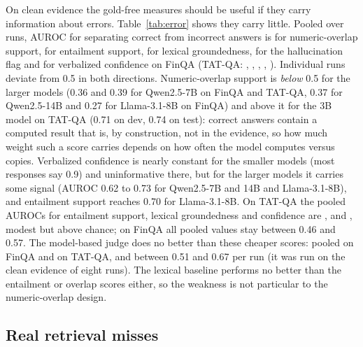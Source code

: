 On clean evidence the gold-free measures should be useful if they carry information about errors.
Table~\ref{tab:error} shows they carry little.
Pooled over runs, AUROC for separating correct from incorrect answers is \errFinoverlap{} for numeric-overlap support, \errFinnli{} for entailment support, \errFinlexical{} for lexical groundedness, \errFinnohalluc{} for the hallucination flag and \errFinconf{} for verbalized confidence on FinQA (TAT-QA: \errTatoverlap, \errTatnli, \errTatlexical, \errTatnohalluc, \errTatconf).
Individual runs deviate from 0.5 in both directions.
Numeric-overlap support is \emph{below} 0.5 for the larger models (0.36 and 0.39 for Qwen2.5-7B on FinQA and TAT-QA, 0.37 for Qwen2.5-14B and 0.27 for Llama-3.1-8B on FinQA) and above it for the 3B model on TAT-QA (0.71 on dev, 0.74 on test): correct answers contain a computed result that is, by construction, not in the evidence, so how much weight such a score carries depends on how often the model computes versus copies.
Verbalized confidence is nearly constant for the smaller models (most responses say 0.9) and uninformative there, but for the larger models it carries some signal (AUROC 0.62 to 0.73 for Qwen2.5-7B and 14B and Llama-3.1-8B), and entailment support reaches 0.70 for Llama-3.1-8B.
On TAT-QA the pooled AUROCs for entailment support, lexical groundedness and confidence are \errTatnli, \errTatlexical{} and \errTatconf, modest but above chance; on FinQA all pooled values stay between 0.46 and 0.57.
The model-based judge does no better than these cheaper scores: pooled \errFinjudge{} on FinQA and \errTatjudge{} on TAT-QA, and between 0.51 and 0.67 per run (it was run on the clean evidence of eight runs). The lexical baseline performs no better than the entailment or overlap scores either, so the weakness is not particular to the numeric-overlap design.

\begin{table}[t]
\centering\small
\resizebox{\textwidth}{!}{}
\caption{AUROC for separating correct from incorrect answers under clean evidence (numeric questions only; 95\% bootstrap intervals over items).}
\label{tab:error}
\end{table}

\subsection{Real retrieval misses}


